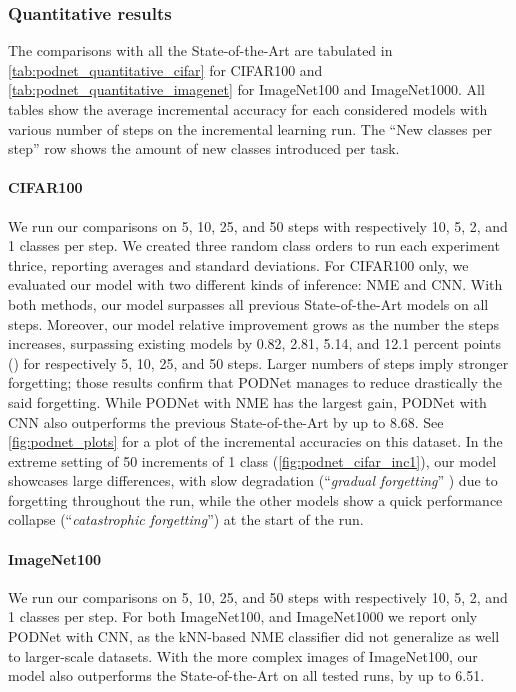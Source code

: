 




\subsubsection{Quantitative results}
\label{sec:podnet_quantitative_results}

The comparisons with all the State-of-the-Art are tabulated in
\autoref{tab:podnet_quantitative_cifar} for CIFAR100 and \autoref{tab:podnet_quantitative_imagenet}
for ImageNet100 and ImageNet1000. All tables show the average incremental accuracy for each
considered models with various number of steps on the incremental learning run. The ``New classes
per step'' row shows the amount of new classes introduced per task.

\paragraph{CIFAR100} We run our comparisons on 5, 10, 25, and 50 steps with respectively 10, 5, 2,
and 1 classes per step. We created three random class orders to run each experiment thrice,
reporting averages and standard deviations. For CIFAR100 only, we evaluated our model with two
different kinds of inference: \ac{NME} and CNN. With both methods, our model surpasses all previous
State-of-the-Art models on all steps. Moreover, our model relative improvement grows as the number
the steps increases, surpassing existing models by 0.82, 2.81, 5.14, and 12.1 percent points (\pp)
for respectively 5, 10, 25, and 50 steps. Larger numbers of steps imply  stronger forgetting; those
results confirm that PODNet manages to reduce drastically the said forgetting. While PODNet with
\ac{NME} has the largest gain, PODNet with CNN also outperforms the previous State-of-the-Art by up
to 8.68\pp. See \autoref{fig:podnet_plots} for a plot of the incremental accuracies on this dataset.
In the extreme setting of 50 increments of 1 class (\autoref{fig:podnet_cifar_inc1}), our model
showcases large differences, with slow degradation (``\textit{gradual forgetting}''
\citep{french1999catastrophicforgetting}) due to forgetting throughout the run, while the other
models show a quick performance collapse (``\textit{catastrophic forgetting}'') at the start of the
run.

\paragraph{ImageNet100} We run our comparisons on 5, 10, 25, and 50 steps with respectively 10, 5,
2, and 1 classes per step. For both ImageNet100, and ImageNet1000 we report only PODNet with CNN, as
the kNN-based \ac{NME} classifier did not generalize as well to larger-scale datasets. With the more
complex images of ImageNet100, our model also outperforms the State-of-the-Art on all tested runs,
by up to 6.51\pp.

